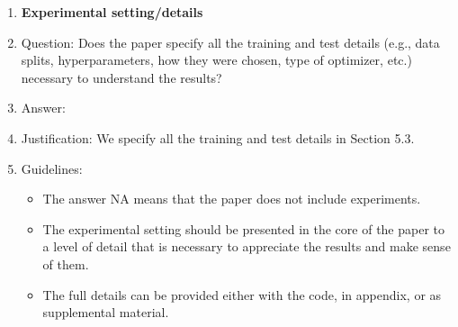 \documentclass{article}
\theoremstyle{definition}
\begin{document}
\begin{enumerate}
\item {\bf Experimental setting/details}
    \item[] Question: Does the paper specify all the training and test details (e.g., data splits, hyperparameters, how they were chosen, type of optimizer, etc.) necessary to understand the results?
    \item[] Answer: \answerYes{} %
    \item[] Justification: We specify all the training and test details in Section 5.3.
    \item[] Guidelines:
    \begin{itemize}
        \item The answer NA means that the paper does not include experiments.
        \item The experimental setting should be presented in the core of the paper to a level of detail that is necessary to appreciate the results and make sense of them.
        \item The full details can be provided either with the code, in appendix, or as supplemental material.
    \end{itemize}


\end{enumerate}
\end{document}
